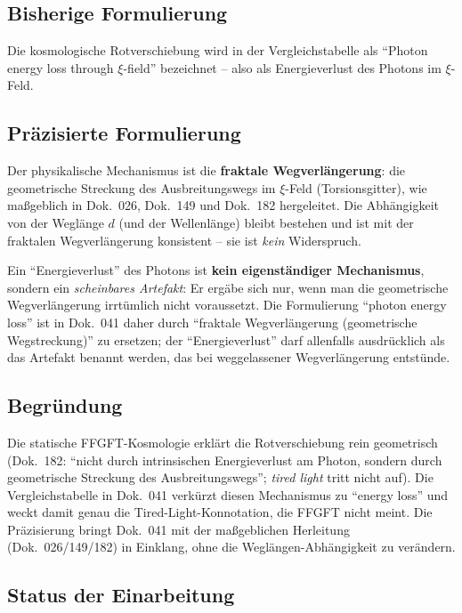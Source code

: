 \subsection*{Bisherige Formulierung}

Die kosmologische Rotverschiebung wird in der Vergleichstabelle als
\enquote{Photon energy loss through $\xi$-field} bezeichnet -- also als
Energieverlust des Photons im $\xi$-Feld.

\subsection*{Präzisierte Formulierung}

Der physikalische Mechanismus ist die \textbf{fraktale Wegverlängerung}:
die geometrische Streckung des Ausbreitungswegs im $\xi$-Feld
(Torsionsgitter), wie maßgeblich in Dok.~026, Dok.~149 und Dok.~182
hergeleitet. Die Abhängigkeit von der Weglänge $d$ (und der Wellenlänge)
bleibt bestehen und ist mit der fraktalen Wegverlängerung konsistent --
sie ist \emph{kein} Widerspruch.

Ein \enquote{Energieverlust} des Photons ist \textbf{kein eigenständiger
Mechanismus}, sondern ein \emph{scheinbares Artefakt}: Er ergäbe sich nur,
wenn man die geometrische Wegverlängerung irrtümlich nicht voraussetzt.
Die Formulierung \enquote{photon energy loss} ist in Dok.~041 daher durch
\enquote{fraktale Wegverlängerung (geometrische Wegstreckung)} zu ersetzen;
der \enquote{Energieverlust} darf allenfalls ausdrücklich als das Artefakt
benannt werden, das bei weggelassener Wegverlängerung entstünde.

\subsection*{Begründung}

Die statische FFGFT-Kosmologie erklärt die Rotverschiebung rein geometrisch
(Dok.~182: \enquote{nicht durch intrinsischen Energieverlust am Photon,
sondern durch geometrische Streckung des Ausbreitungswegs}; \emph{tired
light} tritt nicht auf). Die Vergleichstabelle in Dok.~041 verkürzt diesen
Mechanismus zu \enquote{energy loss} und weckt damit genau die
Tired-Light-Konnotation, die FFGFT nicht meint. Die Präzisierung bringt
Dok.~041 mit der maßgeblichen Herleitung (Dok.~026/149/182) in Einklang,
ohne die Weglängen-Abhängigkeit zu verändern.

\subsection*{Status der Einarbeitung}


